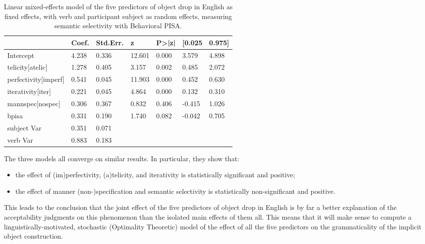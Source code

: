 \begin{table}[htb] %
\caption{Linear mixed-effects model of the five predictors of object drop in English as fixed effects, with verb and participant subject as random effects, measuring semantic selectivity with Behavioral PISA.}
\begin{tabular}{l|llllll}
                         & Coef. & Std.Err. & z      & P\textgreater{}|z| & {[}0.025 & 0.975{]} \\
\hline                         
Intercept                & 4.238 & 0.336    & 12.601 & 0.000              & 3.579    & 4.898    \\
telicity{[}atelic{]}     & 1.278 & 0.405    & 3.157  & 0.002              & 0.485    & 2.072    \\
perfectivity{[}imperf{]} & 0.541 & 0.045    & 11.903 & 0.000              & 0.452    & 0.630    \\
iterativity{[}iter{]}    & 0.221 & 0.045    & 4.864  & 0.000              & 0.132    & 0.310    \\
mannspec{[}nospec{]}     & 0.306 & 0.367    & 0.832  & 0.406              & -0.415   & 1.026    \\
bpisa                    & 0.331 & 0.190    & 1.740  & 0.082              & -0.042   & 0.705    \\
subject                  Var   & 0.351    & 0.071  &                    &          &    &      \\
verb                     Var   & 0.883    & 0.183  &                    &          &     &       
\end{tabular}
\end{table}

The three models all converge on similar results. In particular, they show that:
\begin{itemize}
    \item the effect of (im)perfectivity, (a)telicity, and iterativity is statistically significant and positive;
    \item the effect of manner (non-)specification and semantic selectivity is statistically non-significant and positive.
\end{itemize}
This leads to the conclusion that the joint effect of the five predictors of object drop in English is by far a better explanation of the acceptability judgments on this phenomenon than the isolated main effects of them all. This means that it will make sense to compute a linguistically-motivated, stochastic (Optimality Theoretic) model of the effect of all the five predictors on the grammaticality of the implicit object construction.


